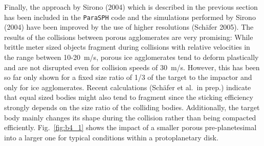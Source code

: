 Finally, the approach by Sirono (2004) which is described in the previous
section has been included in the {\tt ParaSPH} code and the simulations
performed by Sirono (2004) have been improved by the use of higher
resolutions (Sch\"afer 2005). The results of the collisions between porous
agglomerates are very promising: While brittle meter sized objects fragment
during collisions with relative velocities in the range between 10-20~m/s,
porous ice agglomerates tend to deform plastically and are not disrupted
even for collision speeds of 30~m/s. However, this has been so far only
shown for a fixed size ratio of 1/3 of the target to the impactor and only
for ice agglomerates. Recent calculations (Sch\"afer et al.~in prep.)
indicate that equal sized bodies might also tend to fragment since the
sticking efficiency strongly depends on the size ratio of the colliding
bodies. Additionally, the target body mainly changes its shape during the
collision rather than being compacted efficiently. Fig.~\ref{fig:b4_1} shows
the impact of a smaller porous pre-planetesimal into a larger one for
typical conditions within a protoplanetary disk.

